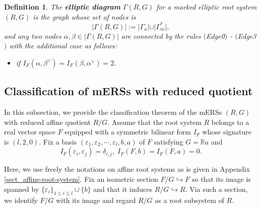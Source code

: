 \documentclass[11pt]{amsart}
\newcommand{\R}{\mathbb{R}}
\newtheorem{defn}{Definition}[section]
\newcommand{\vep}{\varepsilon}
\begin{document}
{\begin{defn}\label{defn_elliptic-diagram-I}
The \textbf{elliptic diagram} 
$\Gamma(R,G)$ 
for a marked elliptic root 
system $(R,G)$ 
is the graph whose set of nodes is 
\[ \vert \Gamma(R,G)\vert :=\vert \Gamma_a \vert \cup \vert \Gamma_m^\ast \vert, \]
and any two nodes $\alpha, \beta \in \vert\Gamma(R,G)\vert $ are connected by the rules 
$($Edge0$)$ - $($Edge3$)$ with the additional case as follows:
\begin{itemize}
\item[(Edge4)] 
 if $I_F(\alpha, \beta^\vee)=I_F(\beta, \alpha^\vee)=2$.
\end{itemize}
\end{defn}



\subsection{Classification of mERSs with reduced quotient}
In this subsection, we provide the classification theorem of the mERSs $(R,G)$ with reduced affine quotient $R/G$. Assume that the root system $R$ belongs to a real vector space $F$ equipped with a symmetric bilinear form $I_F$ whose signature is $(l,2,0)$. 
 Fix a basis $(\vep_1,\vep_2,\cdots, \vep_l, b,a)$ of $F$ satisfying $G=\R a$ and 
\begin{equation}\label{def_base-F}
I_F(\vep_i,\vep_j)=\delta_{i,j},\; I_F(F,b)=I_F(F,a)=0.
\end{equation}

Here, we use freely the notations on affine root systems as is given in Appendix \ref{sect_affine-root-system}. Fix an isometric section $F/G \hookrightarrow F$ so that its image is spanned by $\{ \vep_i \}_{1\leq i\leq l} \cup \{ b\}$ and that it induces $R/G \hookrightarrow R$. Via such a section, we identify $F/G$ with its image and regard $R/G$ as a root subsystem of $R$.  \\

}
\end{document}
